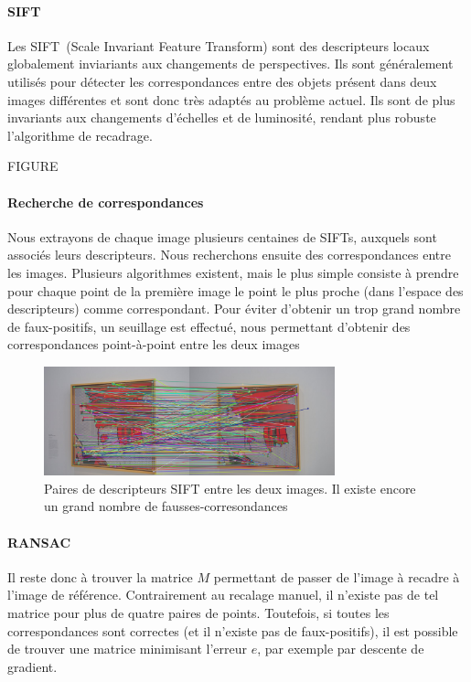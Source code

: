 \documentclass[12pt,a4paper]{article}
\begin{document}
\paragraph{SIFT}
Les SIFT~\citep{lowe1999object}(Scale Invariant Feature Transform) sont des descripteurs locaux globalement inviariants aux changements de perspectives. Ils sont généralement utilisés pour détecter les correspondances entre des objets présent dans deux images différentes et sont donc très adaptés au problème actuel. Ils sont de plus invariants aux changements d'échelles et de luminosité, rendant plus robuste l'algorithme de recadrage.

FIGURE

\paragraph{Recherche de correspondances}
Nous extrayons de chaque image plusieurs centaines de SIFTs, auxquels sont associés leurs descripteurs. Nous recherchons ensuite des correspondances entre les images. Plusieurs algorithmes existent, mais le plus simple consiste à prendre pour chaque point de la première image le point le plus proche (dans l'espace des descripteurs) comme correspondant. Pour éviter d'obtenir un trop grand nombre de faux-positifs, un seuillage est effectué, nous permettant d'obtenir des correspondances point-à-point entre les deux images

\begin{figure}[H]
  \centering
  \includegraphics[width=0.75\textwidth]{Fig/sift_raw.png}
  \caption{Paires de descripteurs SIFT entre les deux images. Il existe encore un grand nombre de fausses-corresondances}
\end{figure}


\paragraph{RANSAC}
Il reste donc à trouver la matrice $M$ permettant de passer de l'image à recadre à l'image de référence. Contrairement au recalage manuel, il n'existe pas de tel matrice pour plus de quatre paires de points. Toutefois, si toutes les correspondances sont correctes (et il n'existe pas de faux-positifs), il est possible de trouver une matrice minimisant l'erreur $e$, par exemple par descente de gradient.
\end{document}
